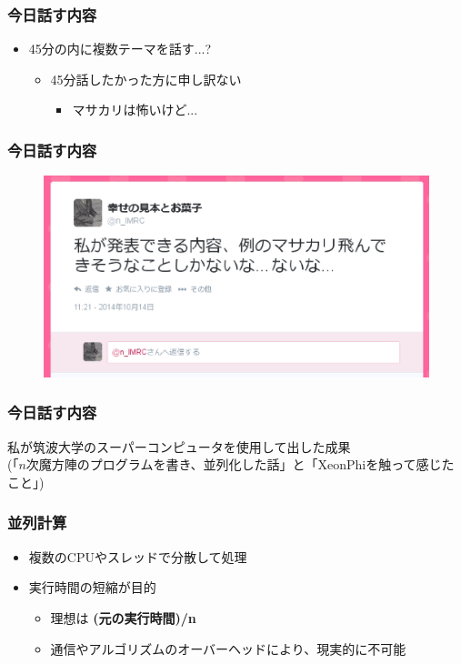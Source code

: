 \documentclass[dvipdfmx,20pt,notheorems,t]{beamer}
\begin{document}
\begin{frame}\frametitle{今日話す内容}
\begin{itemize}
\item 45分の内に複数テーマを話す...?
\begin{itemize}
\item 45分話したかった方に申し訳ない
\begin{itemize}
\item マサカリは怖いけど...
\end{itemize}
\end{itemize}
\end{itemize}
\end{frame}
\begin{frame}\frametitle{今日話す内容}
\begin{figure}[htb]
\centering
\includegraphics[width=\textwidth]{2.eps}
\end{figure}
\end{frame}
\begin{frame}\frametitle{今日話す内容}
\centering
\vspace*{\fill}
私が筑波大学のスーパーコンピュータを使用して出した成果 \\
(「$n$次魔方陣のプログラムを書き、並列化した話」と「XeonPhiを触って感じたこと」)
\vspace*{\fill}
\end{frame}

\begin{frame}\frametitle{並列計算}
\begin{itemize}
\item 複数のCPUやスレッドで分散して処理
\item 実行時間の短縮が目的
\begin{itemize}
\item 理想は \textbf{(元の実行時間)/n}
\item 通信やアルゴリズムのオーバーヘッドにより、現実的に不可能
\end{itemize}
\end{itemize}
\end{frame}
\end{document}
